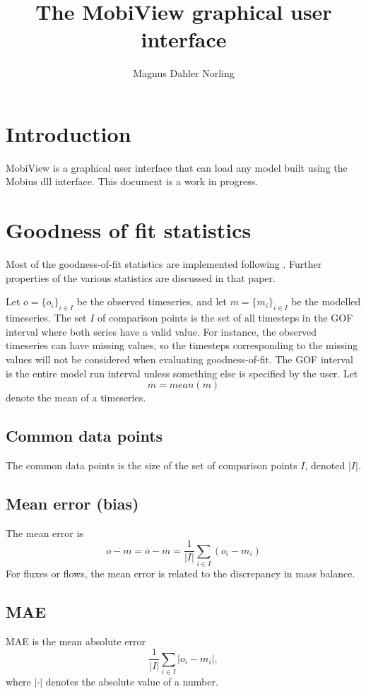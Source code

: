 \documentclass[11pt]{article}
\title{The MobiView graphical user interface}
\author{Magnus Dahler Norling}
\theoremstyle{definition}
\begin{document}
\maketitle

\tableofcontents

\section{Introduction}

MobiView is a graphical user interface that can load any model built using the Mobius dll interface. This document is a work in progress.

\section{Goodness of fit statistics}

Most of the goodness-of-fit statistics are implemented following \cite{krause05}. Further properties of the various statistics are discussed in that paper.

Let $o=\{o_i\}_{i\in I}$ be the observed timeseries, and let $m=\{m_i\}_{i\in I}$ be the modelled timeseries. The set $I$ of comparison points is the set of all timesteps in the GOF interval where both series have a valid value. For instance, the observed timeseries can have missing values, so the timesteps corresponding to the missing values will not be considered when evaluating goodness-of-fit. The GOF interval is the entire model run interval unless something else is specified by the user. Let
\[
\overline{m} = mean(m)
\]
denote the mean of a timeseries.

\subsection{Common data points}
The common data points is the size of the set of comparison points $I$, denoted $|I|$.

\subsection{Mean error (bias)}
The mean error is
\[
\overline{o - m} = \overline{o} -\overline{m} =\frac{1}{|I|} \sum_{i\in I} (o_i - m_i)
\]
For fluxes or flows, the mean error is related to the discrepancy in mass balance.

\subsection{MAE}
MAE is the mean absolute error
\[
\frac{1}{|I|}\sum_{i\in I}|o_i - m_i|,
\]
where $|\cdot|$ denotes the absolute value of a number.
\end{document}
